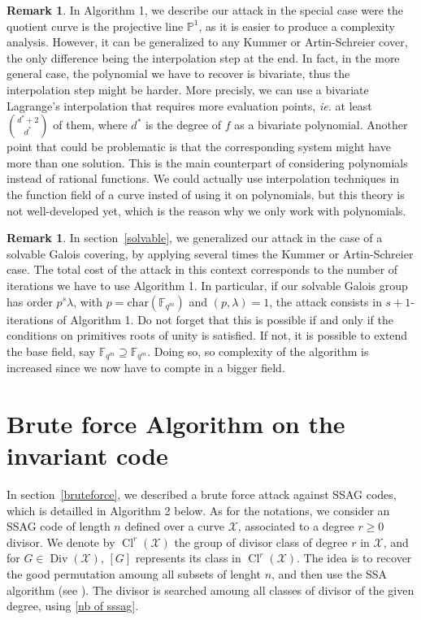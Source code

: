 \documentclass[10pt]{article}
\theoremstyle{definition}
\newtheorem{rq1}[thm]{Remark}
\theoremstyle{definition}
\theoremstyle{definition}
\newcommand{\PP}{\mathbb{P}}
\newcommand{\fqm}{\mathbb{F}_{q^m}}
\newcommand{\X}{\mathcal{X}}
\newcommand{\Div}{\operatorname{Div}}
\newcommand{\Cl}{\operatorname{Cl}}
\begin{document}
\begin{rq1}
In Algorithm 1, we describe our attack in the special case were the quotient curve is the projective line $\PP^1$, as it is easier to produce a complexity analysis. However, it can be generalized to any Kummer or Artin-Schreier cover, the only difference being the interpolation step at the end. In fact, in the more general case, the polynomial we have to recover is bivariate, thus the interpolation step might be harder. More precisly, we can use a bivariate Lagrange's interpolation that requires more evaluation points, \textit{ie.} at least $\binom{d^*+2}{d^*}$ of them, where $d^*$ is the degree of $f$ as a bivariate polynomial. Another point that could be problematic is that the corresponding system might have more than one solution.
This is the main counterpart of considering polynomials instead of rational functions. We could actually use interpolation techniques in the function field of a curve insted of using it on polynomials, but this theory is not well-developed yet, which is the reason why we only work with polynomials.
\end{rq1}

\begin{rq1}
In section~\ref{solvable}, we generalized our attack in the case of a solvable Galois covering, by applying several times the Kummer or Artin-Schreier case. The total cost of the attack in this context corresponds to the number of iterations we have to use Algorithm 1. In particular, if our solvable Galois group has order $p^s\lambda$, with $p=\mathrm{char}(\fqm)$ and $(p,\lambda)=1$, the attack consists in $s+1$-iterations of Algorithm 1. Do not forget that this is possible if and only if the conditions on primitives roots of unity is satisfied. If not, it is possible to extend the base field, say $\mathbb{F}_{q^m} \supseteq \fqm$. Doing so, so complexity of the algorithm is increased since we now have to compte in a bigger field.
\end{rq1}

\newpage

\section{Brute force Algorithm on the invariant code}


In section~\ref{bruteforce}, we described a brute force attack against SSAG codes, which is detailled in Algorithm 2 below. As for the notations, we consider an SSAG code of length $n$ defined over a curve $\X$, associated to a degree $r \geq 0$ divisor. We denote by $\Cl^r(\X)$ the group of divisor class of degree $r$ in $\X$, and for $G \in \Div(\X)$, $[G]$ represents its class in $\Cl^r(\X)$. The idea is to recover the good permutation amoung all subsets of lenght $n$, and then use the SSA algorithm (see \cite{SSA}). The divisor is searched amoung all classes of divisor of the given degree, using \eqref{nb of sssag}.
\end{document}
